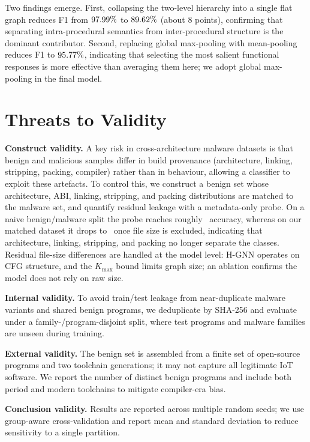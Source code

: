 \documentclass[conference]{IEEEtran}
\begin{document}
Two findings emerge. First, collapsing the two-level hierarchy into a
single flat graph reduces F1 from $97.99\%$ to $89.62\%$
(about $8$ points), confirming that separating intra-procedural semantics
from inter-procedural structure is the dominant contributor. Second,
replacing global max-pooling with mean-pooling reduces F1 to $95.77\%$,
indicating that selecting the most salient functional responses is more
effective than averaging them here; we adopt global max-pooling in the
final model.


\section{Threats to Validity}
\label{sec:threats}

\textbf{Construct validity.} A key risk in cross-architecture malware datasets is that benign and
malicious samples differ in build provenance (architecture, linking, stripping, packing, compiler)
rather than in behaviour, allowing a classifier to exploit these artefacts. To control this, we
construct a benign set whose architecture, ABI, linking, stripping, and packing distributions are
matched to the malware set, and quantify residual leakage with a metadata-only probe. On a naive
benign/malware split the probe reaches roughly \hgnnProbeOld\ accuracy, whereas on our matched dataset
it drops to \hgnnProbeNoSize\ once file size is excluded, indicating that architecture, linking,
stripping, and packing no longer separate the classes. Residual file-size differences are handled at
the model level: H-GNN operates on CFG structure, and the $K_{\max}$ bound limits graph size; an
ablation confirms the model does not rely on raw size.

\textbf{Internal validity.} To avoid train/test leakage from near-duplicate malware variants and
shared benign programs, we deduplicate by SHA-256 and evaluate under a family-/program-disjoint split,
where test programs and malware families are unseen during training.

\textbf{External validity.} The benign set is assembled from a finite set of open-source programs and
two toolchain generations; it may not capture all legitimate IoT software. We report the number of
distinct benign programs and include both period and modern toolchains to mitigate compiler-era bias.

\textbf{Conclusion validity.} Results are reported across multiple random seeds; we use group-aware
cross-validation and report mean and standard deviation to reduce sensitivity to a single partition.
\end{document}
